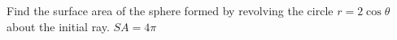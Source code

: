 {Find the surface area of the sphere formed by revolving the circle $r=2\cos\theta$ about the initial ray.
}
{$SA = 4\pi$
}
